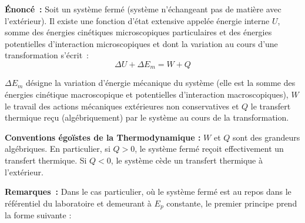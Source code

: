\documentclass{article}
\begin{document}
    \begin{enonce}
        \textbf{Énoncé~:} Soit un système fermé (système n’échangeant pas de matière avec l’extérieur). Il existe une fonction d’état extensive appelée énergie interne $U$, somme des énergies cinétiques microscopiques particulaires et des énergies potentielles d’interaction microscopiques et dont la variation au cours d’une transformation s’écrit~:
        $$\Delta U+\Delta E_m=W+Q$$
    \end{enonce}
    $\Delta E_m$ désigne la variation d’énergie mécanique du système (elle est la somme des énergies cinétique macroscopique et potentielles d’interaction macroscopiques), $W$ le travail des actions mécaniques extérieures non conservatives et $Q$ le transfert thermique reçu (algébriquement) par le système au cours de la transformation.\\
    \begin{attention}
        \textbf{Conventions égoïstes de la Thermodynamique :}
        $W$ et $Q$ sont des grandeurs algébriques. En particulier, si $Q>0$, le système fermé reçoit effectivement un transfert thermique. Si $Q<0$, le système cède un transfert thermique à l'extérieur.
    \end{attention}
    \textbf{Remarques~:} Dans le cas particulier, où le système fermé est au repos dans le référentiel du laboratoire et demeurant à $E_p$ constante, le premier principe prend la forme suivante :
\end{document}
